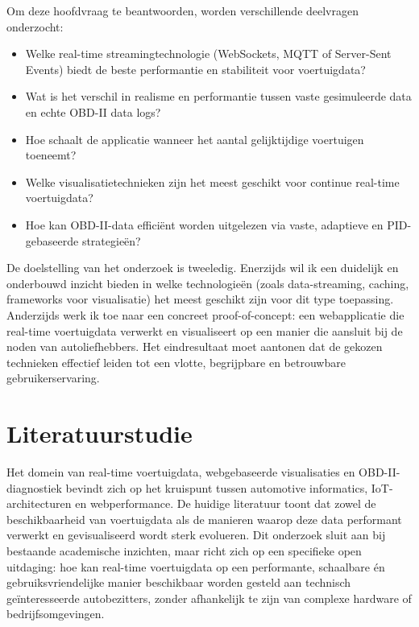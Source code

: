 Om deze hoofdvraag te beantwoorden, worden verschillende deelvragen onderzocht:
\begin{itemize}
    \item Welke real-time streamingtechnologie (WebSockets, MQTT of Server-Sent Events) biedt de beste performantie en stabiliteit voor voertuigdata?
    \item Wat is het verschil in realisme en performantie tussen vaste gesimuleerde data en echte OBD-II data logs?
    \item Hoe schaalt de applicatie wanneer het aantal gelijktijdige voertuigen toeneemt?
    \item Welke visualisatietechnieken zijn het meest geschikt voor continue real-time voertuigdata?
    \item Hoe kan OBD-II-data efficiënt worden uitgelezen via vaste, adaptieve en PID-gebaseerde strategieën?
\end{itemize}

De doelstelling van het onderzoek is tweeledig. Enerzijds wil ik een duidelijk en onderbouwd inzicht bieden in welke technologieën (zoals data-streaming, caching, frameworks voor visualisatie) het meest geschikt zijn voor dit type toepassing. Anderzijds werk ik toe naar een concreet proof-of-concept: een webapplicatie die real-time voertuigdata verwerkt en visualiseert op een manier die aansluit bij de noden van autoliefhebbers. Het eindresultaat moet aantonen dat de gekozen technieken effectief leiden tot een vlotte, begrijpbare en betrouwbare gebruikerservaring.


\section{Literatuurstudie}%
\label{sec:literatuurstudie}

Het domein van real-time voertuigdata, webgebaseerde visualisaties en OBD-II-diagnostiek bevindt zich op het kruispunt tussen automotive informatics, IoT-architecturen en webperformance. De huidige literatuur toont dat zowel de beschikbaarheid van voertuigdata als de manieren waarop deze data performant verwerkt en gevisualiseerd wordt sterk evolueren. Dit onderzoek sluit aan bij bestaande academische inzichten, maar richt zich op een specifieke open uitdaging: hoe kan real-time voertuigdata op een performante, schaalbare én gebruiksvriendelijke manier beschikbaar worden gesteld aan technisch geïnteresseerde autobezitters, zonder afhankelijk te zijn van complexe hardware of bedrijfsomgevingen.

